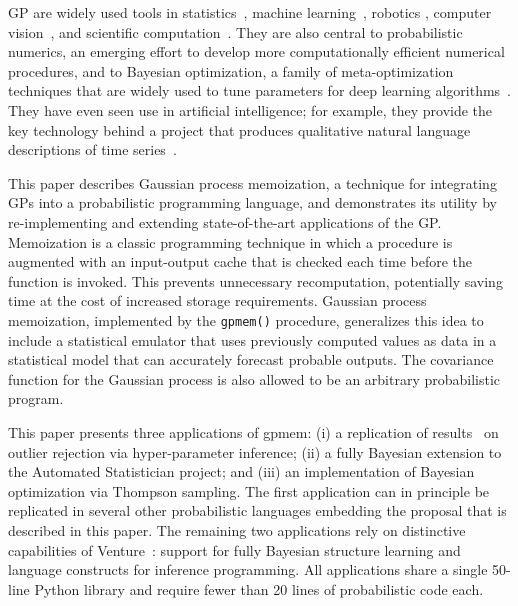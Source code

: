 \ac{GP} are widely used tools in statistics~\citep{barry1986nonparametric}, machine learning~\citep{neal1995bayesian,williams1998bayesian,kuss2005assessing,rasmussen2006gaussian,damianou2013deep}, robotics \citep{ferris2006gaussian}, computer vision~\citep{kemmler2013one}, and scientific computation~\citep{kennedy2001bayesian,schneider2008simulations,kwan2013cosmic}.
They are also central to probabilistic numerics, an emerging effort to develop more computationally efficient numerical procedures, and to Bayesian optimization, a family of meta-optimization techniques that are widely used to tune parameters for deep learning algorithms~\citep{snoek2012practical,gelbart2014bayesian}. They have even seen use in artificial intelligence; for example, they provide the key technology behind a project that produces qualitative natural language descriptions of time series~\citep{duvenaud2013structure,lloyd2014automatic}.

This paper describes Gaussian process memoization, a technique for integrating \ac{GP}s into a probabilistic programming language, and demonstrates its utility by re-implementing and extending state-of-the-art applications of the GP. Memoization is a classic programming technique in which a procedure is augmented with an input-output cache that is checked each time before the function is invoked. This prevents unnecessary recomputation, potentially saving time at the cost of increased storage requirements. Gaussian process memoization, implemented by the {\tt gpmem()} procedure, generalizes this idea to include a statistical emulator that uses previously computed values as data in a statistical model that can accurately forecast probable outputs. The covariance function for the Gaussian process is also allowed to be an arbitrary probabilistic program.

This paper presents three applications of gpmem: (i) a replication of results~\citet{neal1997monte} on outlier rejection via hyper-parameter inference; (ii) a fully Bayesian extension to the Automated Statistician project; and (iii) an implementation of Bayesian optimization via Thompson sampling. The first application can in principle be replicated in several other probabilistic languages embedding the proposal that is described in this paper. The remaining two applications rely on distinctive capabilities of Venture~\citep{mansinghka2014venture}: support for fully Bayesian structure learning and language constructs for inference programming. All applications share a single 50-line Python library and require fewer than 20 lines of probabilistic code each.

